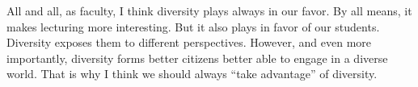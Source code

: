 \documentclass[10pt,stdletter,dateno,sigleft]{newlfm} %
\begin{document}
\begin{newlfm}
All and all, as faculty, I think diversity plays always in our favor. By all means, it makes lecturing more interesting. But it also plays in favor of our  students. Diversity exposes them to different perspectives. However, and even more importantly, diversity forms better citizens better able to engage in a diverse world. That is why I think we should always ``take advantage'' of diversity.

{\unskip}


\end{newlfm}
\end{document}
